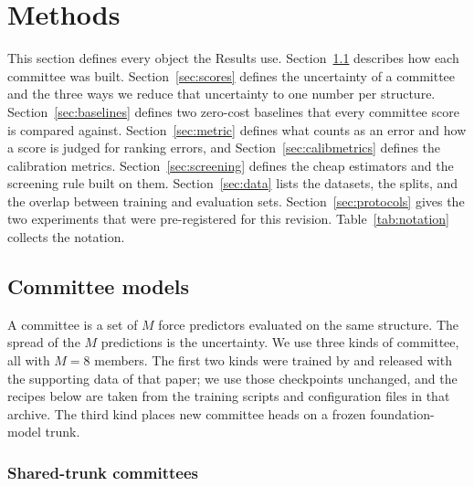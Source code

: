 
\section{Methods}
\label{sec:methods}

This section defines every object the Results use.
Section~\ref{sec:committees} describes how each committee was built.
Section~\ref{sec:scores} defines the uncertainty of a committee and the three
ways we reduce that uncertainty to one number per structure.
Section~\ref{sec:baselines} defines two zero-cost baselines that every
committee score is compared against. Section~\ref{sec:metric} defines what
counts as an error and how a score is judged for ranking errors, and
Section~\ref{sec:calibmetrics} defines the calibration metrics.
Section~\ref{sec:screening} defines the cheap estimators and the screening rule
built on them. Section~\ref{sec:data} lists the datasets, the splits, and the
overlap between training and evaluation sets. Section~\ref{sec:protocols}
gives the two experiments that were pre-registered for this revision.
Table~\ref{tab:notation} collects the notation.

\subsection{Committee models}
\label{sec:committees}

A committee is a set of $M$ force predictors evaluated on the same structure.
The spread of the $M$ predictions is the uncertainty. We use three kinds of
committee, all with $M=8$ members. The first two kinds were trained by
\citet{beck2025committee} and released with the supporting data of that paper;
we use those checkpoints unchanged, and the recipes below are taken from the
training scripts and configuration files in that archive. The third kind places
new committee heads on a frozen foundation-model trunk.

\subsubsection{Shared-trunk committees}

